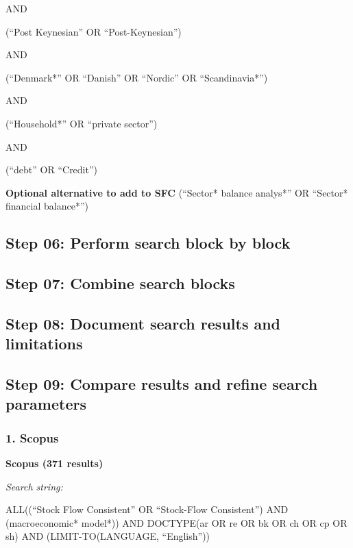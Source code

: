 \documentclass[
]{book}
\begin{document}
AND

(``Post Keynesian'' OR ``Post-Keynesian'')

AND

(``Denmark*'' OR ``Danish'' OR ``Nordic'' OR ``Scandinavia*'')

AND

(``Household*'' OR ``private sector'')

AND

(``debt'' OR ``Credit'')

\textbf{Optional alternative to add to SFC}
(``Sector* balance analys*'' OR ``Sector* financial balance*'')

\hypertarget{step-06-perform-search-block-by-block}{%
\subsection{Step 06: Perform search block by block}\label{step-06-perform-search-block-by-block}}

\hypertarget{step-07-combine-search-blocks}{%
\subsection{Step 07: Combine search blocks}\label{step-07-combine-search-blocks}}

\hypertarget{step-08-document-search-results-and-limitations}{%
\subsection{Step 08: Document search results and limitations}\label{step-08-document-search-results-and-limitations}}

\hypertarget{step-09-compare-results-and-refine-search-parameters}{%
\subsection{Step 09: Compare results and refine search parameters}\label{step-09-compare-results-and-refine-search-parameters}}

\hypertarget{scopus}{%
\subsubsection{1. Scopus}\label{scopus}}

\textbf{Scopus (371 results)}

\emph{Search string:}

ALL((``Stock Flow Consistent'' OR ``Stock-Flow Consistent'') AND (macroeconomic* model*)) AND DOCTYPE(ar OR re OR bk OR ch OR cp OR sh) AND (LIMIT-TO(LANGUAGE, ``English''))
\end{document}
